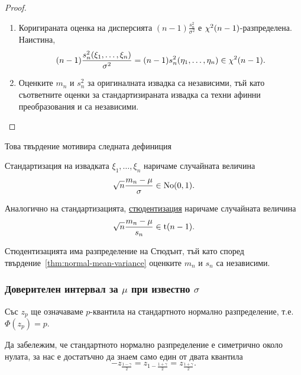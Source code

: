 \documentclass[numbers=endperiod, DIV=15, bibliography=totocnumbered]{scrartcl}
\begin{document}
\begin{proof}
\begin{enumerate}
    \item Коригираната оценка на дисперсията $(n-1) \frac {s_n^2} {\sigma^2}$ е $\operatorname{\chi^2}(n-1)$-разпределена. Наистина,
    \begin{displaymath}
      (n-1) \frac {s_n^2(\xi_1, \ldots, \xi_n)} {\sigma^2}
      =
      (n-1) s_n^2(\eta_1, \ldots, \eta_n)
      \in
      \operatorname{\chi^2}(n - 1).
    \end{displaymath}

    \item Оценките $m_n$ и $s_n^2$ за оригиналната извадка са независими, тъй като съответните оценки за стандартизираната извадка са техни афинни преобразования и са независими.
  \end{enumerate}
\end{proof}

Това твърдение мотивира следната дефиниция
\begin{definition}
  Стандартизация на извадката $\xi_1, \ldots, \xi_n$ наричаме случайната величина
  \begin{displaymath}
    \sqrt n \frac {m_n - \mu} \sigma \in \operatorname{No}(0, 1).
  \end{displaymath}

  Аналогично на стандартизацията, \uline{стюдентизация} наричаме случайната величина
  \begin{displaymath}
    \sqrt n \frac {m_n - \mu} {s_n} \in \operatorname{t}(n - 1).
  \end{displaymath}
\end{definition}

\begin{note}
  Стюдентизацията има разпределение на Стюдънт, тъй като според твърдение~\ref{thm:normal-mean-variance} оценките $m_n$ и $s_n$ са независими.
\end{note}

\subsubsection{Доверителен интервал за $\mu$ при известно $\sigma$}

Със $z_p$ ще означаваме $p$-квантила на стандартното нормално разпределение, т.е. $\Phi(z_p) = p$.

Да забележим, че стандартното нормално разпределение е симетрично около нулата, за нас е достатъчно да знаем само един от двата квантила
\begin{displaymath}
  -z_{\frac {1-\gamma} 2}
  =
  z_{1-\frac {1+\gamma} 2}
  =
  z_{\frac {1+\gamma} 2}.
\end{displaymath}
\end{document}
